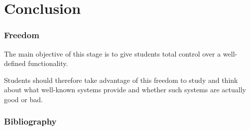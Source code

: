 %
%

\section{Conclusion}


\begin{frame}
  \frametitle{Freedom}

  The main objective of this stage is to give students total control over
  a well-defined functionality.

  \-

  Students should therefore take advantage of this freedom to study and
  think about what well-known systems provide and whether such systems are
  actually good or bad.
\end{frame}

%
%

\begin{frame}
  \frametitle{Bibliography}

  
  
\end{frame}



